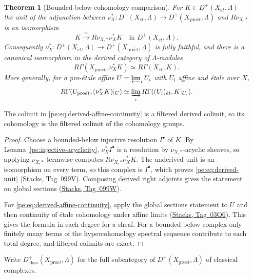 \documentclass[11pt,a4paper]{article}
\numberwithin{equation}{section}
\newtheorem{theorem}{Theorem}[section]
\theoremstyle{definition}
\theoremstyle{remark}
\newcommand{\et}{\acute{e}t}
\newcommand{\proet}{\mathrm{pro}\acute{e}t}
\newcommand{\stacks}[1]{\href{https://stacks.math.columbia.edu/tag/#1}{\textnormal{Stacks, Tag~#1}}}
\begin{document}
\begin{theorem}[Bounded-below cohomology comparison]
\label{pe:cohomology-comparison}
For $K\in D^+(X_{\et},\Lambda)$ the unit of the adjunction between
$\nu_X^*\colon D^+(X_{\et},\Lambda)\to D^+(X_{\proet},\Lambda)$ and
$R\nu_{X,*}$ is an isomorphism
\begin{equation}\label{pe:eq:derived-unit}
 K\xrightarrow{\ \sim\ }R\nu_{X,*}\nu_X^*K\quad\text{in }D^+(X_{\et},\Lambda).
\end{equation}
Consequently $\nu_X^*\colon D^+(X_{\et},\Lambda)\to D^+(X_{\proet},\Lambda)$ is fully faithful,
and there is a canonical isomorphism in the derived category of
$\Lambda$-modules
\[
 R\Gamma(X_{\proet},\nu_X^*K)
   \simeq R\Gamma(X_{\et},K).
\]
More generally, for a pro-\'etale affine $U=\varprojlim_iU_i$ with
$U_i$ affine and \'etale over $X$,
\begin{equation}\label{pe:eq:derived-affine-continuity}
 R\Gamma(U_{\proet},(\nu_X^*K)|_U)
   \simeq \varinjlim_i R\Gamma((U_i)_{\et},K|_{U_i}).
\end{equation}
\end{theorem}
The colimit in \eqref{pe:eq:derived-affine-continuity} is a filtered
derived colimit, so its cohomology is the filtered colimit of the
cohomology groups.
\begin{proof}
Choose a bounded-below injective resolution $I^\bullet$ of $K$. By
Lemma~\ref{pe:injective-acyclicity}, $\nu_X^*I^\bullet$ is a
resolution by $\nu_{X,*}$-acyclic sheaves, so applying $\nu_{X,*}$
termwise computes $R\nu_{X,*}\nu_X^*K$. The underived unit is an
isomorphism on every term, so this complex is $I^\bullet$, which
proves \eqref{pe:eq:derived-unit} (\stacks{099V}). Composing derived
right adjoints gives the statement on global sections (\stacks{099W}).

For \eqref{pe:eq:derived-affine-continuity}, apply the global
sections statement to $U$ and then continuity of \'etale cohomology
under affine limits (\stacks{03Q6}). This gives the formula in each
degree for a sheaf. For a bounded-below complex only finitely many
terms of the hypercohomology spectral sequence contribute to each
total degree, and filtered colimits are exact.
\end{proof}

Write $D^+_{\mathrm{class}}(X_{\proet},\Lambda)$ for the full
subcategory of $D^+(X_{\proet},\Lambda)$ of classical complexes.
\end{document}
